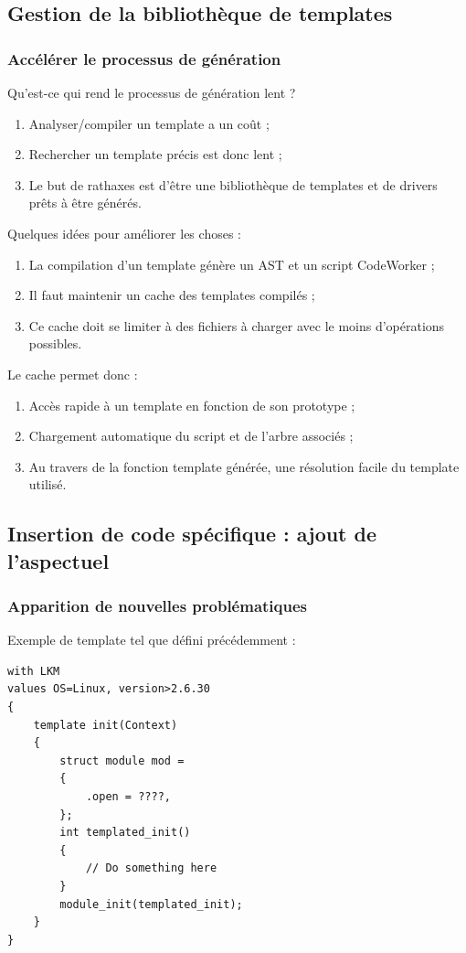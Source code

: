 \documentclass[]{beamer}
\begin{document}
\subsection{Gestion de la bibliothèque de templates}
\begin{frame}
\frametitle{Accélérer le processus de génération}
 {
    Qu'est-ce qui rend le processus de génération lent ?
    \begin{enumerate}[<+->]
        \item Analyser/compiler un template a un coût ;
        \item Rechercher un template précis est donc lent ;
        \item Le but de rathaxes est d'être une bibliothèque de templates
            et de drivers prêts à être générés.
    \end{enumerate}
}
 {
    Quelques idées pour améliorer les choses :
    \begin{enumerate}
        \item<4-> La compilation d'un template génère un AST et un script
            CodeWorker ;
        \item<5-> Il faut maintenir un cache des templates compilés ;
        \item<6-> Ce cache doit se limiter à des fichiers à charger avec
            le moins d'opérations possibles.
    \end{enumerate}
}
 {
    Le cache permet donc :
    \begin{enumerate}
        \item<7-> Accès rapide à un template en fonction de son prototype ;
        \item<8-> Chargement automatique du script et de l'arbre associés ;
        \item<9-> Au travers de la fonction template générée, une résolution
            facile du template utilisé.
    \end{enumerate}
}
\end{frame}


\subsection{Insertion de code spécifique : ajout de l'aspectuel}

\begin{frame}[containsverbatim]
\frametitle{Apparition de nouvelles problématiques}
Exemple de template tel que défini précédemment :
\begin{lstlisting}
with LKM
values OS=Linux, version>2.6.30
{
    template init(Context)
    {
        struct module mod =
        {
            .open = ????,
        };
        int templated_init()
        {
            // Do something here
        }
        module_init(templated_init);
    }
}
\end{lstlisting}
\end{frame}
\end{document}
